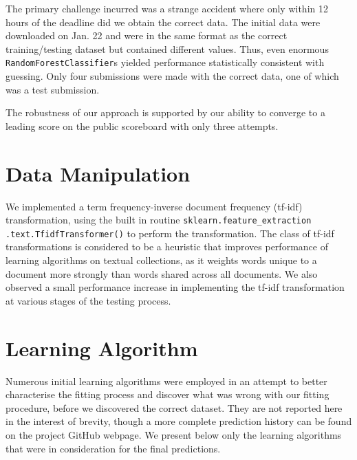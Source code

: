 \documentclass[10pt]{article}
\begin{document}
The primary challenge incurred was a strange accident where only within 12 hours of the deadline did we obtain the correct data. The initial data were downloaded on Jan. 22 and were in the same format as the correct training/testing dataset but contained different values. Thus, even enormous \texttt{RandomForestClassifier}s yielded performance statistically consistent with guessing. Only four submissions were made with the correct data, one of which was a test submission.

The robustness of our approach is supported by our ability to converge to a leading score on the public scoreboard with only three attempts.

\section{Data Manipulation}

We implemented a term frequency-inverse document frequency (tf-idf) transformation, using the built in routine \texttt{sklearn.feature\_extraction} \texttt{.text.TfidfTransformer()} to perform the transformation. The class of tf-idf transformations is considered to be a heuristic that improves performance of learning algorithms on textual collections, as it weights words unique to a document more strongly than words shared across all documents. We also observed a small performance increase in implementing the tf-idf transformation at various stages of the testing process.

\section{Learning Algorithm}

Numerous initial learning algorithms were employed in an attempt to better characterise the fitting process and discover what was wrong with our fitting procedure, before we discovered the correct dataset. They are not reported here in the interest of brevity, though a more complete prediction history can be found on the project GitHub webpage. We present below only the learning algorithms that were in consideration for the final predictions.
\end{document}
